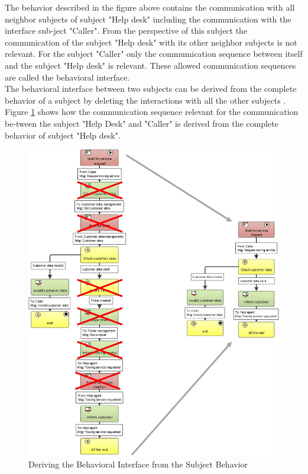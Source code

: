 The behavior described in the figure above contains the communication with all neighbor subjects of subject "Help desk" including the communication with the interface sub-ject "Caller". From the perspective of this subject the communication of the subject "Help desk" with its other neighbor subjects is not relevant. For the subject "Caller" only the commumication sequence between itself and the subject "Help desk" is relevant. These allowed communication sequences are called the behavioral interface.\\
The behavioral interface between two subjects can be derived from the complete behavior of a subject by deleting the interactions with all the other subjects . Figure \ref{fig:car-service-lev10} shows how the communication sequence relevant for the communication be-tween the subject "Help Desk" and "Caller" is derived from the complete behavior of subject "Help desk".

\begin{figure}[htbp]
	\centering
	\includegraphics[width=1.0\linewidth]{Figures/Chapter5/figures-hierarchy/Car-Service-Lev10}
	\caption[Deriving the Behavioral Interface from the Subject Behavior]{Deriving the Behavioral Interface from the Subject Behavior}
	\label{fig:car-service-lev10}
\end{figure}

